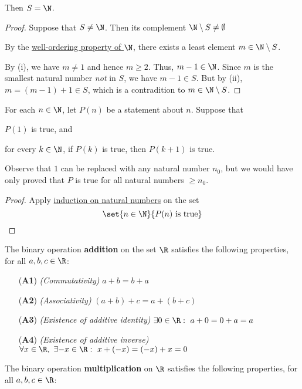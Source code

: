 Then $S=\N$.

\begin{proof}
  Suppose that $S\neq\N$. Then its complement $\N\setminus S\neq\emptyset$

  By the \href{cd7c4d1}{well-ordering property of $\N$}, there exists a least
  element $m\in\N\setminus S$.

  By (i), we have $m\neq 1$ and hence $m\geq2$. Thus, $m-1\in\N$. Since $m$ is
  the smallest natural number \textit{not} in $S$, we have $m-1\in S$. But by
  (ii), $m=(m-1)+1\in S$, which is a contradition to $m\in\N\setminus S$.
\end{proof}

\label{b51ca45}

For each $n\in\N$, let $P(n)$ be a statement about $n$. Suppose that
\begin{enumerati}
  \item $P(1)$ is true, and
  \item for every $k\in\N$, if $P(k)$ is true, then $P(k+1)$ is true.
\end{enumerati}

Observe that $1$ can be replaced with any natural number $n_0$, but we would
have only proved that $P$ is true for all natural numbers $\geq n_0$.

\begin{proof}
  Apply \href{a824f8c}{induction on natural numbers} on the set
  $$
    \set{n\in\N}{P(n)\text{ is true}}
  $$
\end{proof}

\label{bf61f02}

The binary operation \textbf{addition} on the set $\R$ satisfies the following
properties, for all $a,b,c\in\R$:

\begin{itemize}
  \item [(\textbf{A1})] \textit{(Commutativity)} $a+b=b+a$
  \item [(\textbf{A2})] \textit{(Associativity)} $(a+b)+c=a+(b+c)$
  \item [(\textbf{A3})] \textit{(Existence of additive identity)} $\exists0\in\R:\ a+0=0+a=a$
  \item [(\textbf{A4})] \textit{(Existence of additive inverse)} $\forall
        x\in\R,\ \exists {-}x\in\R:\ x+({-}x)=({-}x)+x=0$
\end{itemize}

The binary operation \textbf{multiplication} on $\R$ satisfies the following
properties, for all $a,b,c\in\R$:

